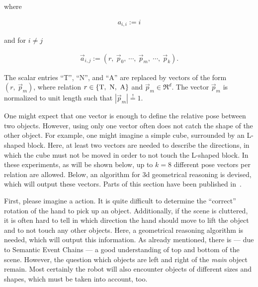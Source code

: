where

\begin{align}
  a_{i,i} := i
\end{align}

and for $i\neq j$

\begin{align}
  \vec{a}_{i,j} := \left( r,~\vec{p}_0,~\cdots,~\vec{p}_m,~\cdots,~\vec{p}_k\right).
\end{align}

The scalar entries ``T'', ``N'', and ``A'' are replaced by vectors of the form $(r,~\vec{p}_m)$, where relation $r \in \{\textup{T},~\textup{N},~\textup{A}\}$ and $\vec{p}_m \in \Re^d$.
The vector $\vec{p}_m$ is normalized to unit length such that $|\vec{p}_m| \overset{!}{=} 1$.

One might expect that one vector is enough to define the relative pose between two objects.
However, using only one vector often does not catch the shape of the other object.
For example, one might imagine a simple cube, surrounded by an L-shaped block.
Here, at least two vectors are needed to describe the directions, in which the cube must not be moved in order to not touch the L-shaped block.
In these experiments, as will be shown below, up to $k=8$ different pose vectors per relation are allowed.
Below, an algorithm for 3d geometrical reasoning is devised, which will output these vectors.
Parts of this section have been published in~\textcite{reichaeinwoergoetter2018}.





First, please imagine a  action.
It is quite difficult to determine the ``correct'' rotation of the hand to pick up an object.
Additionally, if the scene is cluttered, it is often hard to tell in which direction the hand should move to lift the object and to not touch any other objects.
Here, a geometrical reasoning algorithm is needed, which will output this information.
As already mentioned, there is --- due to Semantic Event Chains --- a good understanding of top and bottom of the scene.
However, the question which objects are left and right of the \emph{main} object remain.
Most certainly the robot will also encounter objects of different sizes and shapes, which must be taken into account, too.

